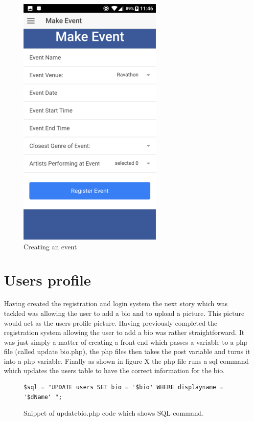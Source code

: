 \begin{center}
\begin{figure}[H]
\includegraphics[scale=0.5]{images/sc18}
\caption{Creating an event}
\end{figure}
\end{center}

\section{Users profile}
Having created the registration and login system the next story which was tackled was allowing the user to add a bio and to upload a picture. This picture would act as the users profile picture. Having previously completed the registration system allowing the user to add a bio was rather straightforward. It was just simply a matter of creating a front end which passes a variable to a php file (called update bio.php), the php files then takes the post variable and turns it into a php variable. Finally as shown in figure X the php file runs a sql command which updates the users table to have the correct information for the bio.

\begin{figure}[H]
\begin{verbatim}
$sql = "UPDATE users SET bio = '$bio' WHERE displayname = '$dName' ";
\end{verbatim}
\caption{Snippet of updatebio.php code which shows SQL command.}
\end{figure}

